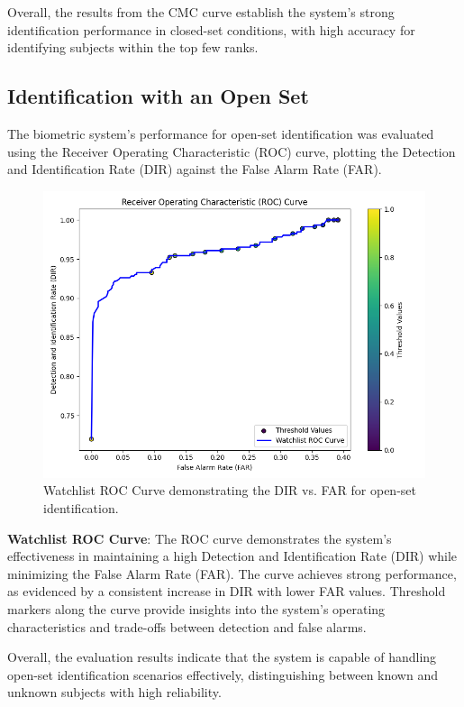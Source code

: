 Overall, the results from the CMC curve establish the system's strong identification performance in closed-set conditions, with high accuracy for identifying subjects within the top few ranks.

\subsection{Identification with an Open Set}

The biometric system's performance for open-set identification was evaluated using the Receiver Operating Characteristic (ROC) curve, plotting the Detection and Identification Rate (DIR) against the False Alarm Rate (FAR).

\begin{figure}[!ht]
    \centering
    \includegraphics[width=\columnwidth]{./images/plots/id-open/watchlist_roc_curve.png}
    \caption{Watchlist ROC Curve demonstrating the DIR vs. FAR for open-set identification.}
    \label{fig:watchlist_roc_curve}
\end{figure}

\textbf{Watchlist ROC Curve}: The ROC curve demonstrates the system's effectiveness in maintaining a high Detection and Identification Rate (DIR) while minimizing the False Alarm Rate (FAR). The curve achieves strong performance, as evidenced by a consistent increase in DIR with lower FAR values. Threshold markers along the curve provide insights into the system's operating characteristics and trade-offs between detection and false alarms. 

Overall, the evaluation results indicate that the system is capable of handling open-set identification scenarios effectively, distinguishing between known and unknown subjects with high reliability.

